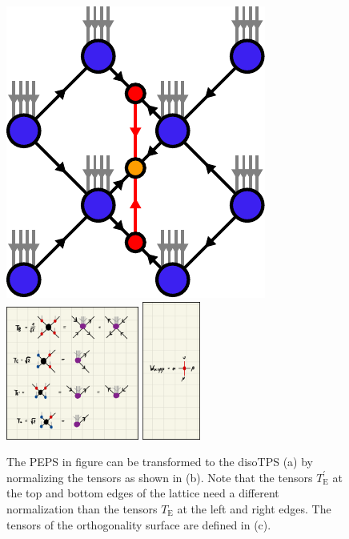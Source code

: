 \begin{figure}
	\centering
	\subcaptionbox{\label{fig:toric_code_disoTPS_representation}}
	{%
		\includegraphics[scale=1]{figures/tikz/toric_code/disoTPS_representation/disoTPS_representation.pdf}
	}
	\subcaptionbox{\label{fig:toric_code_disoTPS_representation_tensor_definitions}}
	{%
		\includegraphics[width=0.39\textwidth]{figures/Toric_Code/toric_code_disoTPS_tensor_definitions.jpeg}
	}
	\subcaptionbox{\label{fig:toric_code_disoTPS_representation_ortho_surface_tensor}}
	{%
		\includegraphics[width=0.17\textwidth]{figures/Toric_Code/toric_code_disoTPS_ortho_surface_tensor.jpeg}
	}
	\caption{The PEPS in figure \protect{} can be transformed to the disoTPS (a) by normalizing the tensors as shown in (b). Note that the tensors $T_\text{E}^\prime$ at the top and bottom edges of the lattice need a different normalization than the tensors $T_\text{E}$ at the left and right edges. The tensors of the orthogonality surface are defined in (c).}
	\label{fig:toric_code_disoTPS}
\end{figure}
